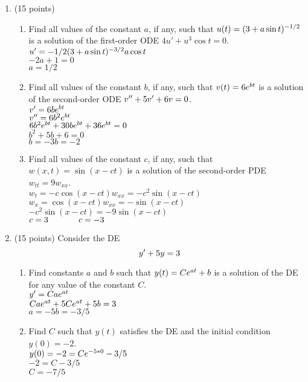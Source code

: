 \documentclass{article}
\begin{document}
\begin{enumerate}

\item (15 points)
\begin{enumerate}
\item Find all values of the constant $a$, if any, such that $u(t)=(3+a\sin t)\sp{-1/2}$ is a solution of the first-order ODE $4u' + u^3 \cos t = 0$.
\\$u'=-1/2  (3+a\sin t)\sp{-3/2}a\cos t$
\\$-2a+1=0$
\\$a=1/2$
\item Find all values of the constant $b$, if any, such that $v(t)=6e\sp{bt}$ is a solution of the second-order ODE $v\sp{\prime\prime}+5v\sp\prime+6v=0$.
\\$v'=6be\sp{bt}$
\\$v''=6b^2e\sp{bt}$
\\$6b^2e\sp{bt}+30be\sp{bt}+36e\sp{bt}=0$
\\$b^2+5b+6=0$
\\$b=-3$\hspace{0.25in}$b=-2$
\item Find all values of the constant $c$, if any, such that $w(x,t)=\sin(x-ct)$ is a solution of the second-order PDE $w_{tt}=9w_{xx}$.
\\$w_{t}=-c\cos(x-ct)$\hspace{0.5in}$w_{xx}=-c^2\sin(x-ct)$
\\$w_{x}=\cos(x-ct)$\hspace{0.5in}$w_{xx}=-\sin(x-ct)$
\\$-c^2\sin(x-ct)=-9\sin(x-ct)$
\\$c=3\hspace{0.5in}c=-3$
\end{enumerate}

\bigskip
\item (15 points) Consider the DE
\[
y\sp\prime+5y=3
\]
\begin{enumerate}
\item Find constants $a$ and $b$ such that $y(t)=Ce\sp{at}+b$ is a solution of the DE for any value of the constant $C$.
\\$y'=Cae\sp{at}$
\\$Cae\sp{at}+5Ce\sp{at}+5b=3$
\\$a=-5$\hspace{0.5in}$b=-3/5$
\item Find $C$ such that $y(t)$ satisfies the DE and the initial condition $y(0)=-2$.
\\$y(0)=-2=Ce\sp{-5*0}-3/5$
\\$-2=C-3/5$
\\$C=-7/5$
\end{enumerate}


\end{enumerate}
\end{document}
